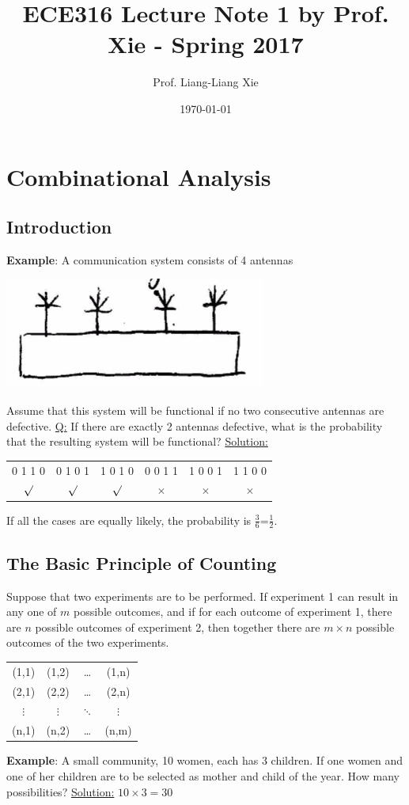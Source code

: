 \documentclass[11pt, letterpaper]{article}
\title{ECE316 Lecture Note 1 by Prof. Xie - Spring 2017}
\author{Prof. Liang-Liang Xie}
\date{\today}
\begin{document}
\section{Combinational Analysis}
\subsection{Introduction}
\textbf{Example}: A communication system consists of 4 antennas

\includegraphics{1-1}

Assume that this system will be functional if no two consecutive antennas are defective. \newline \newline
\noindent
\underline{Q:} If there are exactly 2 antennas defective, what is the probability that the resulting system will be functional? \newline \newline
\noindent
\underline{Solution:}
\begin{center}
  \begin{tabular}{ c c c c c c }
    0 1 1 0 & 0 1 0 1 & 1 0 1 0 & 0 0 1 1 & 1 0 0 1 & 1 1 0 0 \\
    $\surd$ & $\surd$ & $\surd$ & $\times$ & $\times$ & $\times$
  \end{tabular}
\end{center}

If all the cases are equally likely, the probability is \( \frac{3}{6} \)=\( \frac{1}{2} \).

\subsection{The Basic Principle of Counting}
Suppose that two experiments are to be performed. If experiment 1 can result in any one of $m$ possible outcomes, and if for each outcome of experiment 1, there are $n$ possible outcomes of experiment 2, then together there are $m \times n$ possible outcomes of the two experiments.
\begin{center}
  \begin{tabular}{ c c c c }
    (1,1) & (1,2) & \dots & (1,n) \\
    (2,1) & (2,2) & \dots & (2,n) \\
    $\vdots$ & $\vdots$ & $\ddots$ & $\vdots$ \\
    (n,1) & (n,2) & \dots & (n,m)
  \end{tabular}
\end{center}
\textbf{Example}: A small community, 10 women, each has 3 children. If one women and one of her children are to be selected as mother and child of the year. How many possibilities? \newline
\noindent
\underline{Solution:} $10\times3 = 30$ \newline
\end{document}
